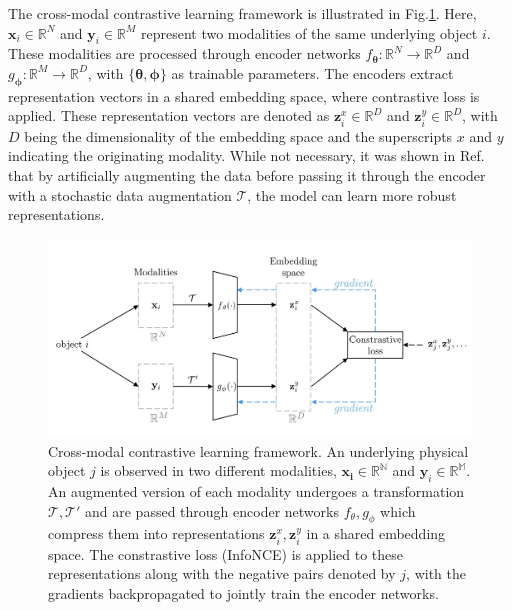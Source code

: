 \documentclass[a4paper,12pt]{article}
\begin{document}
The cross-modal contrastive learning framework is illustrated in Fig.\ref{fig:contrastive_learning}. Here, $\mathbf{x}_i \in \mathbb{R}^N$ and $\mathbf{y}_i \in \mathbb{R}^M$ represent two modalities of the same underlying object $i$. These modalities are processed through encoder networks $f_{\mathbf{\theta}}: \mathbb{R}^N \rightarrow \mathbb{R}^D$ and $g_{\mathbf{\phi}}: \mathbb{R}^M \rightarrow \mathbb{R}^D$, with $\{\mathbf{\theta}, \mathbf{\phi}\}$ as trainable parameters. The encoders extract representation vectors in a shared embedding space, where contrastive loss is applied. These representation vectors are denoted as $\mathbf{z}^x_i \in \mathbb{R}^D$ and $\mathbf{z}^y_i \in \mathbb{R}^D$, with $D$ being the dimensionality of the embedding space and the superscripts $x$ and $y$ indicating the originating modality. While not necessary, it was shown in Ref.\cite{crossCLIP} that by artificially augmenting the data before passing it through the encoder with a stochastic data augmentation $\mathcal{T}$, the model can learn more robust representations.

\begin{figure}[H]
    \centering
    \includegraphics[width=\textwidth]{../figures/diagram_contrastive_learning.pdf}
    \caption{Cross-modal contrastive learning framework. An underlying physical object $j$ is observed in two different modalities, $\mathbf{x_i}\in \mathbb{R^N}$ and $\mathbf{y}_i \in \mathbb{R^M}$. An augmented version of each modality undergoes a transformation $\mathcal{T}, \mathcal{T}'$ and are passed through encoder networks $f_{\theta}, g_{\phi}$ which compress them into representations $\mathbf{z}^x_i, \mathbf{z}^y_i$ in a shared embedding space. The constrastive loss (InfoNCE) is applied to these representations along with the negative pairs denoted by $j$, with the gradients backpropagated to jointly train the encoder networks.}
    \label{fig:contrastive_learning}
\end{figure}
\end{document}
